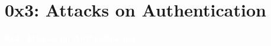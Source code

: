 \documentclass[aspectratio=169]{beamer}
\begin{document}


\section{0x3: Attacks on Authentication}
{
\begin{frame}
\huge{\textcolor{white}{\textbf{0x4: Attacks on Authentication}}}
\end{frame}
}
\end{document}
